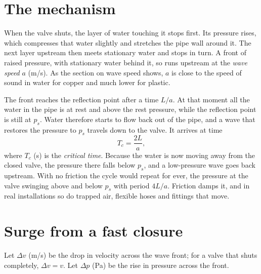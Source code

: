\documentclass[a4paper,justified,nobib]{tufte-handout}
\begin{document}
\section{The mechanism}

When the valve shuts, the layer of water touching it stops first. Its pressure
rises, which compresses that water slightly and stretches the pipe wall around
it. The next layer upstream then meets stationary water and stops in turn. A
front of raised pressure, with stationary water behind it, so runs upstream at
the \emph{wave speed} $a$ (m/s). As the section on wave speed shows, $a$ is
close to the speed of sound in water for copper and much lower for plastic.

The front reaches the reflection point after a time $L/a$. At that moment all
the water in the pipe is at rest and above the rest pressure, while the
reflection point is still at $p_s$. Water therefore starts to flow back out of
the pipe, and a wave that restores the pressure to $p_s$ travels down to the
valve. It arrives at time
\begin{equation}
  T_c = \frac{2L}{a},
  \label{eq:tc}
\end{equation}
where $T_c$ (s) is the \emph{critical time}. Because the
water is now moving away from the closed valve, the pressure there falls below
$p_s$, and a low-pressure wave goes back upstream. With no friction the cycle
would repeat for ever, the pressure at the valve swinging above and below $p_s$
with period $4L/a$. Friction damps it, and in real installations so do trapped
air, flexible hoses and fittings that move.

\section{Surge from a fast closure}

Let $\Delta v$ (m/s) be the drop in velocity across the wave front; for a valve
that shuts completely, $\Delta v=v$. Let $\Delta p$ (Pa) be the rise in
pressure across the front.
\end{document}
